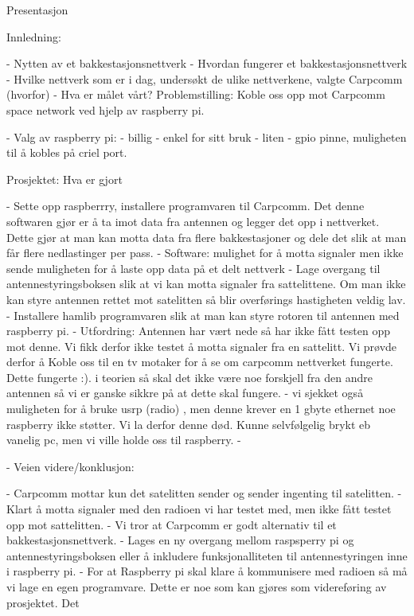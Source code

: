 

Presentasjon

Innledning:

- Nytten av et bakkestasjonsnettverk
- Hvordan fungerer et bakkestasjonsnettverk
- Hvilke nettverk som er i dag, undersøkt de ulike nettverkene, valgte Carpcomm (hvorfor)
- Hva er målet vårt? Problemstilling: Koble oss opp mot Carpcomm space network ved hjelp av raspberry pi.

- Valg av raspberry pi:
		- billig
		- enkel for sitt bruk
		- liten
		- gpio pinne, muligheten til å kobles på criel port.

Prosjektet: Hva er gjort

- Sette opp raspberrry, installere programvaren til Carpcomm.
	Det denne softwaren gjør er å ta imot data fra antennen og legger det opp i nettverket. Dette gjør at man kan motta data fra flere bakkestasjoner og dele det slik at man får flere nedlastinger per pass.
- Software:		
	mulighet for å motta signaler men ikke sende
	muligheten for å laste opp data på et delt nettverk
- Lage overgang til antennestyringsboksen slik at vi kan motta signaler fra sattelittene. Om man ikke kan styre antennen rettet mot satelitten så blir overførings hastigheten veldig lav. 
- Installere hamlib programvaren slik at man kan styre rotoren til antennen med raspberry pi.
- Utfordring: Antennen har vært nede så har ikke fått testen opp mot denne. Vi fikk derfor ikke testet å motta signaler fra en sattelitt. Vi prøvde derfor å  Koble oss til en tv motaker for å se om carpcomm nettverket fungerte. Dette fungerte :). i teorien så skal det ikke være noe forskjell fra den andre antennen så vi er ganske sikkre på at dette skal fungere. 
- vi sjekket også muligheten for å bruke usrp (radio) , men denne krever en 1 gbyte ethernet noe raspberry ikke støtter. Vi la derfor denne død. Kunne selvfølgelig brykt eb vanelig pc, men vi ville holde oss til raspberry.
-

- Veien videre/konklusjon:

- Carpcomm mottar kun det satelitten sender og sender ingenting til satelitten. 
- Klart å motta signaler med den radioen vi har testet med, men ikke fått testet opp mot sattelitten. 
- Vi tror at Carpcomm er godt alternativ til et bakkestasjonsnettverk. 
- Lages en ny overgang mellom raspsperry pi og antennestyringsboksen eller å inkludere funksjonalliteten til antennestyringen inne i raspberry pi. 
- For at Raspberry pi skal klare å kommunisere med radioen så må vi lage en egen programvare. Dette er noe som kan gjøres som videreføring av prosjektet. Det





